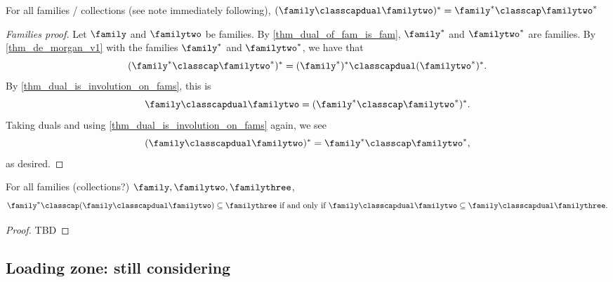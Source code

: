 \begin{theorem}
    \label{thm_de_morgan_v1_dual}
    For all families / collections (see note immediately following), $(\family \classcapdual \familytwo)^* = \family^* \classcap \familytwo^*$
\end{theorem}


\begin{proof}[Families proof]
    Let $\family$ and $\familytwo$ be families.  By \cref{thm_dual_of_fam_is_fam}, $\family^*$ and $\familytwo^*$ are families.  By \cref{thm_de_morgan_v1} with the families $\family^*$ and $\familytwo^*$, we have that
    \[(\family^* \classcap \familytwo^*)^* = (\family^*)^* \classcapdual (\familytwo^*)^*.\]
    By \cref{thm_dual_is_involution_on_fams}, this is
    \[\family \classcapdual \familytwo = (\family^* \classcap \familytwo^*)^*.\]
    Taking duals and using \cref{thm_dual_is_involution_on_fams} again, we see
    \[(\family \classcapdual \familytwo)^* = \family^* \classcap \familytwo^*,\]
    as desired.
\end{proof}


\begin{theorem}
\label{thm_combo_algebra_statement_one}
\leanok{}
    For all families (collections?) $\family, \familytwo, \familythree$,
    \[\family^* \classcap (\family \classcapdual \familytwo) \subseteq \familythree \text{ if and only if } \family \classcapdual \familytwo \subseteq \family \classcapdual \familythree.\]
\end{theorem}

\begin{proof}
    TBD
\end{proof}

\subsection{Loading zone: still considering}

